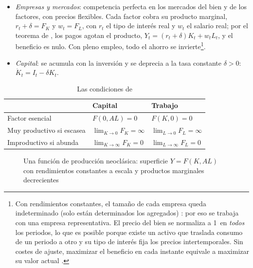 \documentclass[11pt]{article}
\begin{document}
\begin{itemize}
\item \emph{Empresas y mercados}: competencia perfecta en los mercados del bien y de los factores, con precios flexibles. Cada factor cobra su producto marginal, $r_t+\delta=F_K$ y $w_t=F_L$, con $r_t$ el tipo de interés real y $w_t$ el salario real; por el teorema de , los pagos agotan el producto, $Y_t=(r_t+\delta)K_t+w_tL_t$, y el beneficio es nulo. Con pleno empleo, todo el ahorro se invierte\footnote{Con rendimientos constantes, el tamaño de cada empresa queda indeterminado (solo están determinados los agregados)  : por eso se trabaja con una empresa representativa. El precio del bien se normaliza a 1~en \emph{todos} los periodos, lo que es posible porque existe un activo que traslada consumo de un periodo a otro y su tipo de interés fija los precios intertemporales\nocite{Arrow1964Role}\nocite{Acemoglu2009}. Sin costes de ajuste, maximizar el beneficio en cada instante equivale a maximizar su valor actual .}.
\item \emph{Capital}: se acumula con la inversión y se deprecia a la tasa constante $\delta>0$: $\dot K_t=I_t-\delta K_t$.
\end{itemize}

\begin{table}[H]
\centering
\caption{Las condiciones de }\label{tab:inada}
\small
\renewcommand{\arraystretch}{1.4}
\begin{tabular}{>{\raggedright\arraybackslash}m{4.2cm}>{\centering\arraybackslash}m{4.6cm}>{\centering\arraybackslash}m{4.6cm}}
\toprule
\rowcolor{tceeazulpalido} & \textbf{Capital} & \textbf{Trabajo}\\
\midrule
Factor esencial & $F(0,AL)=0$ & $F(K,0)=0$\\
Muy productivo si escasea & $\lim_{K\to0}F_K=\infty$ & $\lim_{L\to0}F_L=\infty$\\
Improductivo si abunda & $\lim_{K\to\infty}F_K=0$ & $\lim_{L\to\infty}F_L=0$\\
\bottomrule
\end{tabular}
\end{table}

\begin{figure}[H]
\centering
\caption{Una función de producción neoclásica: superficie $Y=F(K,AL)$ con rendimientos constantes a escala y productos marginales decrecientes}\label{fig:funcion-produccion}
\end{figure}
\end{document}
